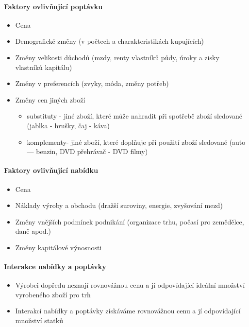 \documentclass[11pt,a4paper,twoside]{book}
\begin{document}
	\paragraph*{Faktory ovlivňující poptávku}
	\begin{itemize}
		\item Cena
		\item Demografické změny (v počtech a charakteristikách kupujících)
		\item Změny velikosti důchodů (mzdy, renty vlastníků půdy, úroky a zisky vlastníků kapitálu)
		\item Změny v preferencích (zvyky, móda, změny potřeb)
		\item Změny cen jiných zboží
		\begin{itemize}
			\item substituty - jiné zboží, které může nahradit při spotřebě zboží sledované (jablka - hrušky, čaj - káva)
			\item komplementy- jiné zboží, které doplňuje při použití zboží sledované (auto — benzin, DVD přehrávač - DVD filmy)
		\end{itemize}
	\end{itemize}
	
	\paragraph*{Faktory ovlivňující nabídku}
	\begin{itemize}
		\item Cena
		\item Náklady výroby a obchodu (dražší suroviny, energie, zvyšování mezd)
		\item Změny vnějších podmínek podnikání (organizace trhu, počasí pro zemědělce, daně apod.)
		\item Změny kapitálové výnosnosti
	\end{itemize}
	
	\paragraph*{Interakce nabídky a poptávky}
	\begin{itemize}
		\item Výrobci dopředu neznají rovnovážnou cenu a jí odpovídající ideální množství vyrobeného zboží pro trh
		\item Interakcí nabídky a poptávky získáváme rovnovážnou cenu a jí odpovídající množství statků
	\end{itemize}
	
\end{document}
